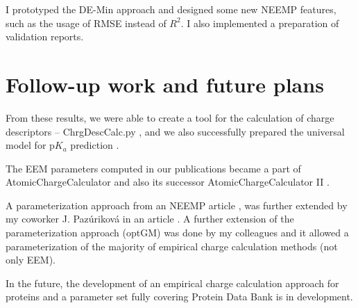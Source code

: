 I prototyped the DE-Min approach and designed some new NEEMP features, such as
the usage of RMSE instead of $R^2$. I also implemented a preparation of validation
reports.

\chapter{Follow-up work and future plans}

From these results, we were able to create a tool for the calculation
of charge descriptors -- ChrgDescCalc.py \cite{Hejret2015}, and we also
successfully prepared the universal model for p$K_a$ prediction \cite{Hejret2017}.

The EEM parameters computed in our publications \cite{Geidl2015_eem, Racek2016}
became a part of AtomicChargeCalculator \cite{Ionescu2015} and also its successor 
AtomicChargeCalculator II \cite{Racek2020}.

A parameterization approach from an NEEMP article \cite{Racek2016}, was further
extended by my coworker J. Pazúriková in an article \cite{Pazurikova2016}.
A further extension of the parameterization approach
(optGM) was done by my colleagues \cite{Schindler2021} and it allowed a parameterization
of the majority of empirical charge calculation methods (not only EEM).

In the future, the development of an empirical charge calculation approach
for proteins and a parameter set fully covering Protein Data Bank is
in development.


